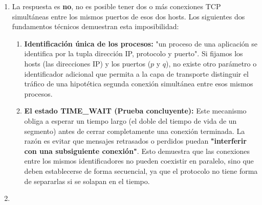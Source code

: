\begin{enumerate}[label=\color{red}\textbf{\arabic*)}]
	      Para lograr esto, TCP no confía ciegamente en que las capas inferiores le entreguen todo perfectamente ordenado, sino que implementa un mecanismo propio:
	      \begin{itemize}[label=\textbullet]
		      \item TCP utiliza un diseño de \textbf{recepción selectiva} en su ventana deslizante.
		      \item Si los segmentos de datos llegan desordenados, el receptor TCP no se los entrega directamente a la aplicación, sino que \textbf{"almacena los segmentos fuera de secuencia"} en un búfer.
		      \item Una vez que tiene todas las piezas correctas, es el propio TCP quien \textbf{"le pasa los datos a la capa de aplicación en orden"}.
	      \end{itemize}
	      Por lo tanto, la gestión del orden de los segmentos es una tarea crítica y visible de la que se encarga la capa de transporte mediante TCP.
	\item {}

	      La respuesta es \textbf{no}, no es posible tener dos o más conexiones TCP simultáneas entre los mismos puertos de esos dos hosts. Los siguientes dos fundamentos técnicos demuestran esta imposibilidad:
	      \begin{enumerate}[label=\arabic*)]
		      \item \textbf{Identificación única de los procesos:} "un proceso de una aplicación se identifica por la tupla dirección IP, protocolo y puerto". Si fijamos los hosts (las direcciones IP) y los puertos ($p$ y $q$), no existe otro parámetro o identificador adicional que permita a la capa de transporte distinguir el tráfico de una hipotética segunda conexión simultánea entre esos mismos procesos.
		      \item \textbf{El estado TIME\_WAIT (Prueba concluyente):} Este mecanismo obliga a esperar un tiempo largo (el doble del tiempo de vida de un segmento) antes de cerrar completamente una conexión terminada. La razón es evitar que mensajes retrasados o perdidos puedan \textbf{"interferir con una subsiguiente conexión"}. Esto demuestra que las conexiones entre los mismos identificadores no pueden coexistir en paralelo, sino que deben establecerse de forma secuencial, ya que el protocolo no tiene forma de separarlas si se solapan en el tiempo.
	      \end{enumerate}
	\item {}


\end{enumerate}
